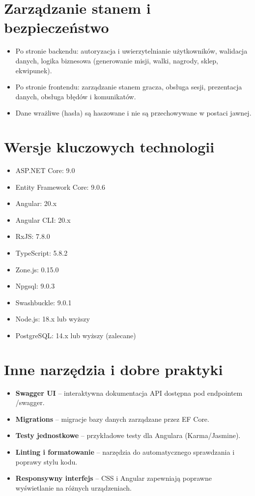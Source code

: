\section{Zarządzanie stanem i bezpieczeństwo}
\begin{itemize}
    \item Po stronie backendu: autoryzacja i uwierzytelnianie użytkowników, walidacja danych, logika biznesowa (generowanie misji, walki, nagrody, sklep, ekwipunek).
    \item Po stronie frontendu: zarządzanie stanem gracza, obsługa sesji, prezentacja danych, obsługa błędów i komunikatów.
    \item Dane wrażliwe (hasła) są haszowane i nie są przechowywane w postaci jawnej.
\end{itemize}

\section{Wersje kluczowych technologii}
\begin{itemize}
    \item ASP.NET Core: 9.0
    \item Entity Framework Core: 9.0.6
    \item Angular: 20.x
    \item Angular CLI: 20.x
    \item RxJS: 7.8.0
    \item TypeScript: 5.8.2
    \item Zone.js: 0.15.0
    \item Npgsql: 9.0.3
    \item Swashbuckle: 9.0.1
    \item Node.js: 18.x lub wyższy
    \item PostgreSQL: 14.x lub wyższy (zalecane)
\end{itemize}

\section{Inne narzędzia i dobre praktyki}
\begin{itemize}
    \item \textbf{Swagger UI} -- interaktywna dokumentacja API dostępna pod endpointem /swagger.
    \item \textbf{Migrations} -- migracje bazy danych zarządzane przez EF Core.
    \item \textbf{Testy jednostkowe} -- przykładowe testy dla Angulara (Karma/Jasmine).
    \item \textbf{Linting i formatowanie} -- narzędzia do automatycznego sprawdzania i poprawy stylu kodu.
    \item \textbf{Responsywny interfejs} -- CSS i Angular zapewniają poprawne wyświetlanie na różnych urządzeniach.
\end{itemize}

